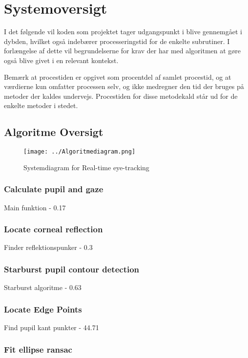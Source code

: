 \documentclass[analyse.tex]{subfiles}
\begin{document}
\section{Systemoversigt}
I det følgende vil koden som projektet tager udgangspunkt i blive gennemgået i dybden, hvilket også indebærer processeringstid for de enkelte subrutiner. I forlængelse af dette vil begrundelserne for krav der har med algoritmen at gøre også blive givet i en relevant kontekst.

Bemærk at procestiden er opgivet som procentdel af samlet procestid, og at værdierne kun omfatter processen selv, og ikke medregner den tid der bruges på metoder der kaldes undervejs. Procestiden for disse metodekald står ud for de enkelte metoder i stedet.
	
\subsection{Algoritme Oversigt}
\begin{figure}[h]
\centering
\texttt{[image: ../Algoritmediagram.png]}
\caption[Systemdiagram]{Systemdiagram for Real-time eye-tracking}
\label{fig:Systemdiagram}
\end{figure}

\subsubsection{Calculate pupil and gaze}

Main funktion - 0.17%

\subsubsection{Locate corneal reflection}

Finder reflektionspunker - 0.3%

\subsubsection{Starburst pupil contour detection}

Starburst algoritme - 0.63%

\subsubsection{Locate Edge Points}

Find pupil kant punkter - 44.71%

\subsubsection{Fit ellipse ransac}
\end{document}

